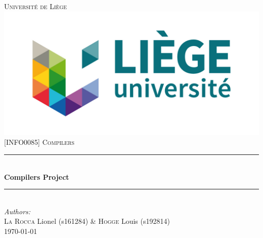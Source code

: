 \documentclass[11pt]{article}
\begin{document}
	
	\begin{titlepage}
		
		\newcommand{\HRule}{\rule{\linewidth}{0.5mm}} %
		
		\center %
		
		
		\textsc{\LARGE Université de Liège}\\[1.5cm] %
		\includegraphics[scale=1]{uliege.jpg}\\[1cm]
		\textsc{\Large [INFO0085] Compilers}\\[0.5cm] %
		
		
		\HRule \\[0.4cm]
		{ \huge \bfseries Compilers Project}\\[0.4cm] %
		\HRule \\[1.5cm]
		
		
		\Large \emph{Authors:}\\
		\textsc{La Rocca} Lionel (s161284) \& \textsc{Hogge} Louis (s192814)\\[3cm]%
		
		
		{\large \today}\\[2cm] %
		
		
		\vfill %

	\end{titlepage}
\newpage
\tableofcontents
\newpage
\end{document}
